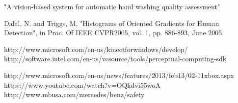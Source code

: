 \documentclass[a4paper,11pt,oneside]{book}
\begin{document}
\begin{thebibliography}{2}
 "A vision-based system for automatic hand washing quality assessment"

 Dalal, N. and Triggs, M, "Histograms of Oriented Gradients for Human Detection", in Proc. Of IEEE CVPR2005, vol. 1, pp. 886-893, June 2005.

 http://www.microsoft.com/en-us/kinectforwindows/develop/
 http://software.intel.com/en-us/vcsource/tools/perceptual-computing-sdk

 http://www.microsoft.com/en-us/news/features/2013/feb13/02-11xbox.aspx
 https://www.youtube.com/watch?v=OQkdvi55woA
 http://www.mbusa.com/mercedes/benz/safety
\end{thebibliography}
\end{document}
